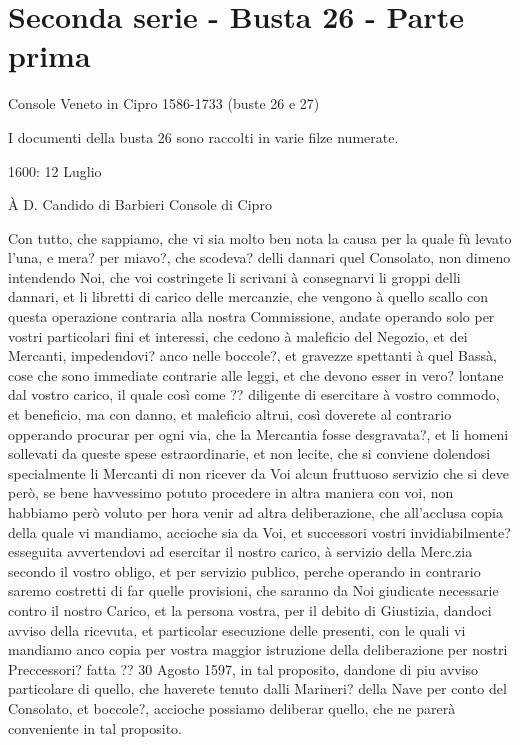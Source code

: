 \section{Seconda serie - Busta 26 - Parte prima}

Console Veneto in Cipro 1586-1733 (buste 26 e 27)

I documenti della busta 26 sono raccolti in varie filze numerate.

\setcounter{docnumber}{13}


\begin{center}
1600: 12 Luglio

À D. Candido di Barbieri Console di Cipro
\end{center}

Con tutto, che sappiamo, che vi sia molto ben nota la causa per la quale
fù levato l'una,  e mera? per miavo?, che  scodeva? delli dannari quel
Consolato, non dimeno intendendo  Noi, che voi costringete li scrivani
à consegnarvi li groppi delli  dannari, et li libretti di carico delle
mercanzie, che vengono à quello scallo con questa operazione contraria
alla nostra  Commissione, andate operando solo  per vostri particolari
fini  et  interessi,  che  cedono  à maleficio  del  Negozio,  et  dei
Mercanti, impedendovi?  anco nelle  boccole?, et gravezze  spettanti à
quel  Bassà, cose  che sono  immediate  contrarie alle  leggi, et  che
devono esser in vero? lontane dal vostro carico, il quale così come ??
diligente di esercitare à vostro  commodo, et beneficio, ma con danno,
et maleficio altrui, così doverete al contrario opperando procurar per
ogni via, che  la Mercantia fosse desgravata?, et  li homeni sollevati
da  queste  spese  estraordinarie,  et  non lecite,  che  si  conviene
dolendosi  specialmente  li  Mercanti  di  non ricever  da  Voi  alcun
fruttuoso  servizio  che  si  deve  però, se  bene  havvessimo  potuto
procedere in altra maniera con  voi, non habbiamo però voluto per hora
venir  ad altra deliberazione,  che all'acclusa  copia della  quale vi
mandiamo, accioche  sia da Voi, et  successori vostri invidiabilmente?
esseguita avvertendovi ad esercitar il nostro carico, à servizio della
Merc.zia  secondo il vostro  obligo, et  per servizio  publico, perche
operando in  contrario saremo costretti di far  quelle provisioni, che
saranno da  Noi giudicate  necessarie contro il  nostro Carico,  et la
persona  vostra, per  il  debito di  Giustizia,  dandoci avviso  della
ricevuta,  et particolar esecuzione  delle presenti,  con le  quali vi
mandiamo anco copia per  vostra maggior istruzione della deliberazione
per nostri  Preccessori? fatta  ?? 30 Agosto  1597, in  tal proposito,
dandone di piu avviso particolare di quello, che haverete tenuto dalli
Marineri? della  Nave per conto  del Consolato, et  boccole?, accioche
possiamo deliberar quello, che ne parerà conveniente in tal proposito.

